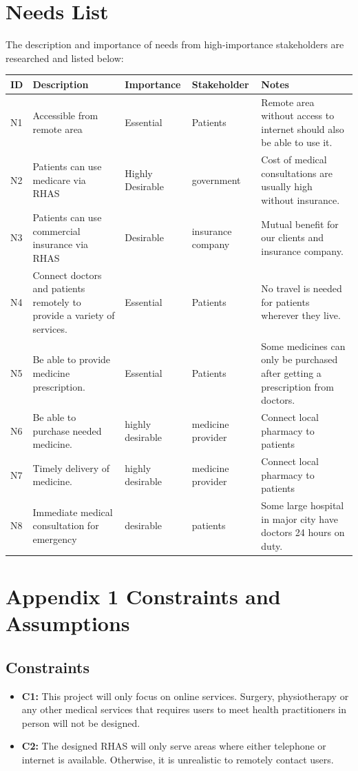 \documentclass{article}
\begin{document}
\section{Needs List}
The description and importance of needs from high-importance stakeholders are researched and listed below:
\begin{center}
\begin{tabular}{ | m{2em} | m{9em}| m{5em} | m{5em} | m{12em} |} 
  \hline
  ID & Description & Importance & Stakeholder & Notes\\ 
  \hline
  N1 & Accessible from remote area & Essential & Patients & Remote area without access to internet should also be able to use it.\\
  \hline
  N2 & Patients can use medicare via RHAS & Highly  Desirable & government & Cost of medical consultations are usually high without insurance.\\
  \hline
  N3 & Patients can use commercial insurance via RHAS & Desirable & insurance company & Mutual benefit for our clients and insurance company.\\
  \hline
  N4 & Connect doctors and patients remotely to provide a variety of services. & Essential & Patients & No travel is needed for patients wherever they live.\\
  \hline
  N5 & Be able to provide medicine prescription. & Essential & Patients & Some medicines can only be purchased after getting a prescription from doctors.\\
  \hline
  N6 & Be able to purchase needed medicine. & highly desirable & medicine provider & Connect local pharmacy to patients\\
  \hline
  N7 & Timely delivery of medicine. & highly desirable & medicine provider & Connect local pharmacy to patients\\
  \hline
  N8 & Immediate medical consultation for emergency & desirable & patients & Some large hospital in major city have doctors 24 hours on duty.\\
  \hline
\end{tabular}
\end{center}

\setcounter{secnumdepth}{0}
\section{Appendix 1 Constraints and Assumptions}
\subsection{Constraints}
\begin{itemize}[label={}]
\item \textbf{C1:} This project will only focus on online services. Surgery, physiotherapy or any other medical services that requires users to meet health practitioners in person will not be designed.
\item \textbf{C2:} The designed RHAS will only serve areas where either telephone or internet is available. Otherwise, it is unrealistic to remotely contact users.
\end{itemize}
\end{document}
